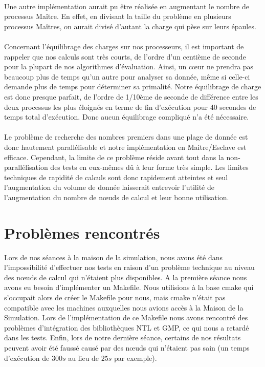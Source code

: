 \paragraph{}Une autre implémentation aurait pu être réalisée en augmentant le nombre de processus Maître. En effet, en divisant la taille du problème en plusieurs processus Maîtres, on aurait divisé d'autant la charge qui pèse sur leurs épaules.

\paragraph{}Concernant l'équilibrage des charges sur nos processeurs, il est important de rappeler que nos calculs sont très courts, de l'ordre d'un centième de seconde pour la plupart de nos algorithmes d'évaluation.
Ainsi, un cœur ne prendra pas beaucoup plus de temps qu'un autre pour analyser sa donnée, même si celle-ci demande plus de temps pour déterminer sa primalité.
Notre équilibrage de charge est donc presque parfait, de l'ordre de 1/10ème de seconde de différence entre les deux processus les plus éloignés en terme de fin d’exécution pour 40 secondes de temps total d’exécution. Donc aucun équilibrage compliqué n'a été nécessaire.

\paragraph{}Le problème de recherche des nombres premiers dans une plage de donnée est donc hautement parallélisable et notre implémentation en Maitre/Esclave est efficace. Cependant, la limite de ce problème réside avant tout dans la non-parallélisation des tests en eux-mêmes dû à leur forme très simple.
Les limites techniques de rapidité de calculs sont donc rapidement atteintes et seul l'augmentation du volume de donnée laisserait entrevoir l'utilité de l'augmentation du nombre de nœuds de calcul et leur bonne utilisation.		
		
	\section{Problèmes rencontrés}
	Lors de nos séances à la maison de la simulation, nous avons été dans l'impossibilité d'effectuer nos tests en raison d'un problème technique au niveau des nœuds de calcul qui n'étaient plus disponibles.
	A la première séance nous avons eu besoin d'implémenter un Makefile. Nous utilisions à la base cmake qui s'occupait alors de créer le Makefile pour nous, mais cmake n'était pas compatible avec les machines auxquelles nous avions accès à la Maison de la Simulation. Lors de l'implémentation de ce Makefile nous avons rencontré des problèmes d'intégration des bibliothèques NTL et GMP, ce qui nous a retardé dans les tests.
	Enfin, lors de notre dernière séance, certains de nos résultats peuvent avoir été faussé causé par des nœuds qui n'étaient pas sain (un temps d'exécution de $300s$ au lieu de $25s$ par exemple).
					
